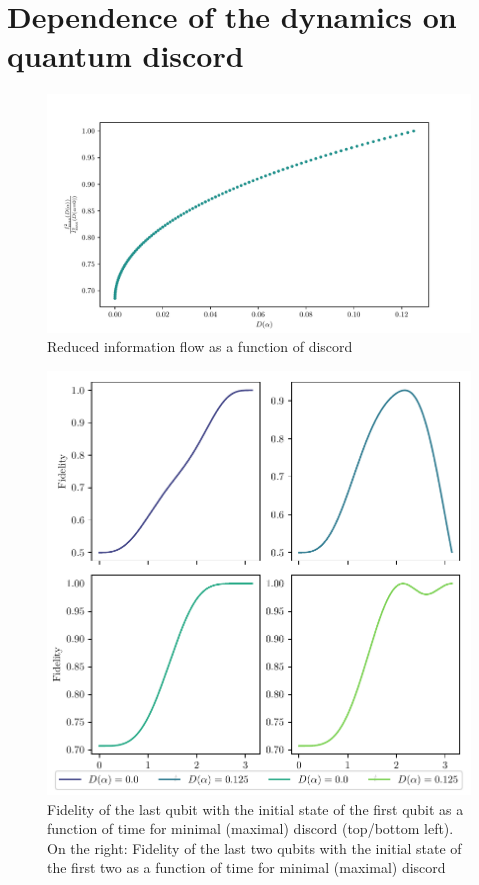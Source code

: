 \documentclass[a4paper,11pt]{scrartcl}
\begin{document}
\section{Dependence of the dynamics on quantum discord}
\begin{figure}[H]
    \centering
    \includegraphics[width=\textwidth]{i_dot_sq_max_reduced_of_discord.pdf}
    \caption{Reduced information flow as a function of discord}
    \label{fig:inf-as-func-of-disc}
\end{figure}

\begin{figure}[H]
    \centering
    \includegraphics{max_und_min_discord_fidelities.pdf}
    \caption{Fidelity of the last qubit with the initial state of the first qubit
    as a function of time for minimal (maximal) discord (top/bottom left).
    On the right: Fidelity of the last two qubits with the initial state of the first two
    as a function of time for minimal (maximal) discord}
    \label{fig:gridplot-fid-of-disc}
\end{figure}
\end{document}
